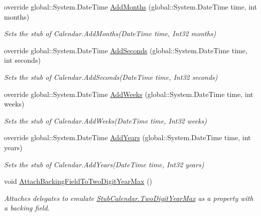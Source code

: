 \begin{DoxyCompactItemize}
override global\-::\-System.\-Date\-Time \hyperlink{class_system_1_1_globalization_1_1_fakes_1_1_stub_calendar_a2fd16e84b0324e2c212fd54cb079a872}{Add\-Months} (global\-::\-System.\-Date\-Time time, int months)
\begin{DoxyCompactList}\small\item\em Sets the stub of Calendar.\-Add\-Months(\-Date\-Time time, Int32 months)\end{DoxyCompactList}\item 
override global\-::\-System.\-Date\-Time \hyperlink{class_system_1_1_globalization_1_1_fakes_1_1_stub_calendar_a60a2213507dae0cae2d4bcfeefc2d5f1}{Add\-Seconds} (global\-::\-System.\-Date\-Time time, int seconds)
\begin{DoxyCompactList}\small\item\em Sets the stub of Calendar.\-Add\-Seconds(\-Date\-Time time, Int32 seconds)\end{DoxyCompactList}\item 
override global\-::\-System.\-Date\-Time \hyperlink{class_system_1_1_globalization_1_1_fakes_1_1_stub_calendar_a1c622d1489869ca119eab93d03958f77}{Add\-Weeks} (global\-::\-System.\-Date\-Time time, int weeks)
\begin{DoxyCompactList}\small\item\em Sets the stub of Calendar.\-Add\-Weeks(\-Date\-Time time, Int32 weeks)\end{DoxyCompactList}\item 
override global\-::\-System.\-Date\-Time \hyperlink{class_system_1_1_globalization_1_1_fakes_1_1_stub_calendar_a18432d0ff849d26841a2d7df270aa37e}{Add\-Years} (global\-::\-System.\-Date\-Time time, int years)
\begin{DoxyCompactList}\small\item\em Sets the stub of Calendar.\-Add\-Years(\-Date\-Time time, Int32 years)\end{DoxyCompactList}\item 
void \hyperlink{class_system_1_1_globalization_1_1_fakes_1_1_stub_calendar_a1194ee1a82d25c8d3d1d547c1c0b2161}{Attach\-Backing\-Field\-To\-Two\-Digit\-Year\-Max} ()
\begin{DoxyCompactList}\small\item\em Attaches delegates to emulate \hyperlink{class_system_1_1_globalization_1_1_fakes_1_1_stub_calendar_a7a91c28e91cb8174870b99c49d525f52}{Stub\-Calendar.\-Two\-Digit\-Year\-Max} as a property with a backing field.\end{DoxyCompactList}\item 

\end{DoxyCompactItemize}
